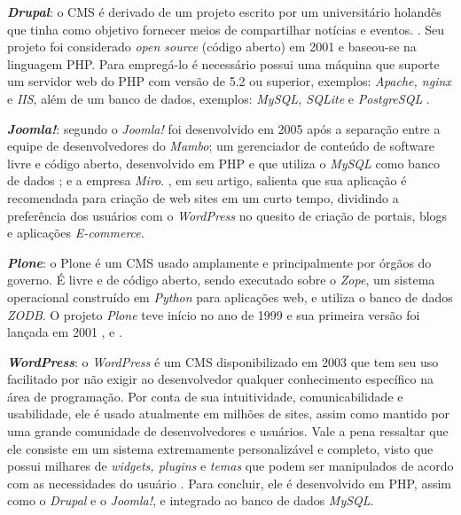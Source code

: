 \textbf{\textit{Drupal}}: o CMS é derivado de um projeto escrito por um universitário holandês que tinha como objetivo fornecer meios de compartilhar notícias e eventos. . Seu projeto foi considerado \textit{open source} (código aberto) em 2001 e baseou-se na linguagem PHP. Para empregá-lo é necessário possui uma máquina que suporte um servidor web do PHP com versão de 5.2 ou superior, exemplos: \textit{Apache, nginx} e \textit{IIS}, além de um banco de dados, exemplos: \textit{MySQL, SQLite} e \textit{PostgreSQL} . 

\textbf{\textit{Joomla!}}: segundo  o \textit{Joomla!} foi desenvolvido em 2005 após a separação entre a equipe de desenvolvedores do \textit{Mambo}; um gerenciador de conteúdo de software livre e código aberto, desenvolvido em PHP e que utiliza o \textit{MySQL} como banco de dados ; e a empresa \textit{Miro}. , em seu artigo, salienta que sua aplicação é recomendada para criação de web sites em um curto tempo, dividindo a preferência dos usuários com o \textit{WordPress} no quesito de criação de portais, blogs e aplicações \textit{E-commerce}.

\textbf{\textit{Plone}}: o Plone é um CMS usado amplamente e principalmente por órgãos do governo. É livre e de código aberto, sendo executado sobre o \textit{Zope}, um sistema operacional construído em \textit{Python} para aplicações web, e utiliza o banco de dados \textit{ZODB}. O projeto \textit{Plone} teve início no ano de 1999 e sua primeira versão foi lançada em 2001 ,  e .


\textbf{\textit{WordPress}}: o \textit{WordPress} é um CMS disponibilizado em 2003 que tem seu uso facilitado por não exigir ao desenvolvedor qualquer conhecimento específico na área de programação. Por conta de sua intuitividade, comunicabilidade e usabilidade, ele é usado atualmente em milhões de sites, assim como mantido por uma grande comunidade de desenvolvedores e usuários. Vale a pena ressaltar que ele consiste em um sistema extremamente personalizável e completo, visto que possui milhares de \textit{widgets, plugins} e \textit{temas} que podem ser manipulados de acordo com as necessidades do usuário . Para concluir, ele é desenvolvido em PHP, assim como o \textit{Drupal} e o \textit{Joomla!}, e integrado ao banco de dados \textit{MySQL}. 

